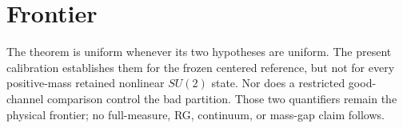 \documentclass[11pt]{article}
\begin{document}
\section{Frontier}
The theorem is uniform whenever its two hypotheses are uniform.  The present
calibration establishes them for the frozen centered reference, but not for
every positive-mass retained nonlinear $SU(2)$ state.  Nor does a restricted
good-channel comparison control the bad partition.  Those two quantifiers
remain the physical frontier; no full-measure, RG, continuum, or mass-gap
claim follows.
\end{document}
